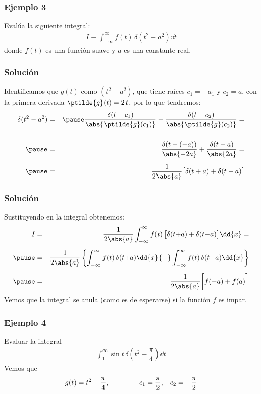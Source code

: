 \begin{frame}
\frametitle{Ejemplo 3}
Evalúa la siguiente integral:
\begin{align*}
I \equiv \int_{-\infty}^{\infty} f(t) \, \delta(t^{2} - a^{2}) \dd{t}
\end{align*}
donde $f(t)$ es una función suave y $a$ es una constante real.
\end{frame}
\begin{frame}
\frametitle{Solución}
Identificamos que $g(t)$ como $(t^{2} - a^{2})$, \pause que tiene raíces $c_{1} = -a_{1}$ y $c_{2} = a$, con la primera derivada $\ptilde{g}(t) = 2 \, t$, por lo que tendremos:
\pause
\begin{eqnarray*}
\delta(t^{2} - a^{2}) &=& \pause \dfrac{\delta (t - c_{1})}{\abs{\ptilde{g}(c_{1})}} + \dfrac{\delta (t - c_{2})}{\abs{\ptilde{g}(c_{2})}} = \\[0.5cm] \pause
&=& \dfrac{\delta (t - (-a))}{\abs{-2a}} + \dfrac{\delta (t - a)}{\abs{2a}} = \\[0.5em] \pause
&=& \dfrac{1}{2 \abs{a}} \big[ \delta(t + a) + \delta(t - a) \big]
\end{eqnarray*}
\end{frame}
\begin{frame}
\frametitle{Solución}
Sustituyendo en la integral obtenemos:
\begin{eqnarray*}
I &=& \dfrac{1}{2 \abs{a}} \int_{-\infty}^{\infty} f(t) \, \big[ \delta(t {+} a) + \delta(t {-} a) \big] \dd{x} = \\[0.5em] \pause
&=& \dfrac{1}{2 \abs{a}} \left\{ \int_{-\infty}^{\infty} f(t) \, \delta(t {+} a) \dd{x} {+} \int_{-\infty}^{\infty} f(t) \, \delta(t {-} a) \dd{x} \right\} \\[0.5em] \pause
&=& \dfrac{1}{2 \abs{a}} \bigg[ f(-a) + f(a) \bigg]
\end{eqnarray*}
\pause
Vemos que la integral se anula (como es de esperarse) si la función $f$ es impar.
\end{frame}
\begin{frame}
\frametitle{Ejemplo 4}
Evaluar la integral
\begin{align*}
\int_{1}^{\infty} \sin t \, \delta \left( t^{2} - \dfrac{\pi}{4} \right) \dd{t}
\end{align*}
\pause
Vemos que
\begin{align*}
g(t) = t^{2} - \dfrac{\pi}{4}, \hspace{1.5cm} c_{1} = \dfrac{\pi}{2}, \hspace{0.3cm} c_{2} = - \dfrac{\pi}{2}
\end{align*}
\end{frame}
